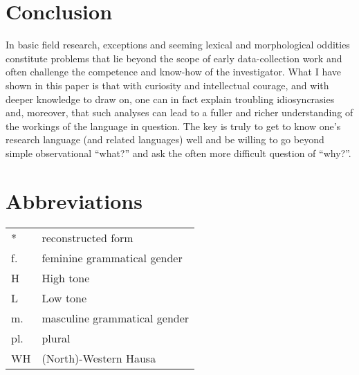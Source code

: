 \documentclass[output=paper,colorlinks,citecolor=brown]{langscibook}
\begin{document}
\section{Conclusion}

In basic field research, exceptions and seeming lexical and morphological oddities constitute problems that lie beyond the scope of early data-collection work and often challenge the competence and know-how of the investigator.  What I have shown in this paper is that with curiosity and intellectual courage, and with deeper knowledge to draw on, one can in fact explain troubling idiosyncrasies and, moreover, that such analyses can lead to a fuller and richer understanding of the workings of the language in question. The key is truly to get to know one’s research language (and related languages) well and be willing to go beyond simple observational “what?” and ask the often more difficult question of “why?”. 

\section*{Abbreviations}
\begin{tabular}{@{}ll@{}}
* & reconstructed form \\
f. & feminine grammatical gender\\
H & High tone \\
L & Low tone \\
m. & masculine grammatical gender \\
pl. & plural \\
WH & (North)-Western Hausa \\
\end{tabular}






{\sloppy\printbibliography[heading=subbibliography,notkeyword=this]}
\end{document}
